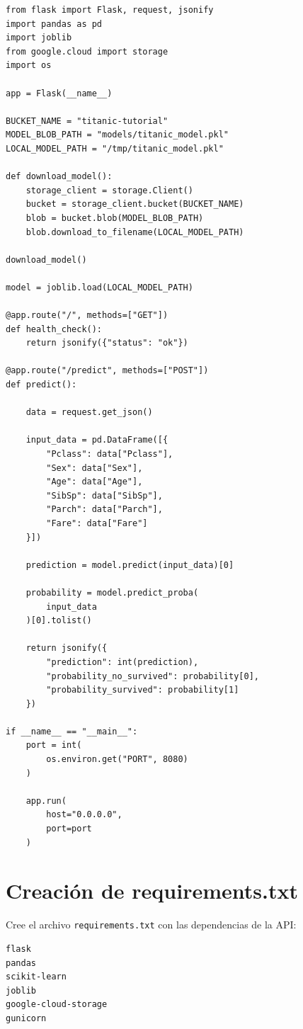 \documentclass[
  coursetitle={Cómputo Nube y Tecnologías Emergentes},
  coursehours={96},
  coursedate={Verano 2026},
  doctype={Tutorial},
  otherlangs={english,french},
  authorname={Lázaro},
  authorsurname={Bustio-Martínez},
  authortitle={PhD},
  role={Profesor Investigador},
  email={lbustio@inaoe.mx},
  phone={5559504000},
  ext={7459},
  institution={Instituto Nacional de Astrofísica, Óptica y Electrónica (INAOE)},
  department={Maestría en Ciencias en Tecnologías de Seguridad},
  address={Luis Enrique Erro 1, Sta. Ma. Tonantzintla, San Andrés Cholula, CP 72840, Puebla, México},
  margin={0.5in}
]{../../lbustio_lecture_notes}
\begin{document}
\begin{lstlisting}
from flask import Flask, request, jsonify
import pandas as pd
import joblib
from google.cloud import storage
import os

app = Flask(__name__)

BUCKET_NAME = "titanic-tutorial"
MODEL_BLOB_PATH = "models/titanic_model.pkl"
LOCAL_MODEL_PATH = "/tmp/titanic_model.pkl"

def download_model():
    storage_client = storage.Client()
    bucket = storage_client.bucket(BUCKET_NAME)
    blob = bucket.blob(MODEL_BLOB_PATH)
    blob.download_to_filename(LOCAL_MODEL_PATH)

download_model()

model = joblib.load(LOCAL_MODEL_PATH)

@app.route("/", methods=["GET"])
def health_check():
    return jsonify({"status": "ok"})

@app.route("/predict", methods=["POST"])
def predict():

    data = request.get_json()

    input_data = pd.DataFrame([{
        "Pclass": data["Pclass"],
        "Sex": data["Sex"],
        "Age": data["Age"],
        "SibSp": data["SibSp"],
        "Parch": data["Parch"],
        "Fare": data["Fare"]
    }])

    prediction = model.predict(input_data)[0]

    probability = model.predict_proba(
        input_data
    )[0].tolist()

    return jsonify({
        "prediction": int(prediction),
        "probability_no_survived": probability[0],
        "probability_survived": probability[1]
    })

if __name__ == "__main__":
    port = int(
        os.environ.get("PORT", 8080)
    )

    app.run(
        host="0.0.0.0",
        port=port
    )
\end{lstlisting}

\section{Creación de requirements.txt}

Cree el archivo \texttt{requirements.txt} con las dependencias de la API:

\begin{lstlisting}
flask
pandas
scikit-learn
joblib
google-cloud-storage
gunicorn
\end{lstlisting}
\end{document}
